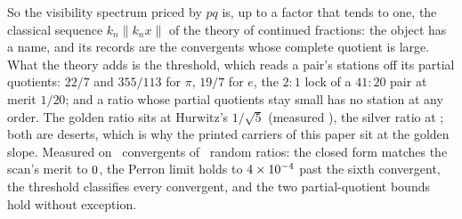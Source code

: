 So the visibility spectrum priced by $pq$ is, up to a factor that tends to
one, the classical sequence $k_n\lVert k_nx\rVert$ of the theory of continued
fractions: the object has a name, and its records are the convergents whose
complete quotient is large. What the theory adds is the threshold, which
reads a pair's stations off its partial quotients: $22/7$ and $355/113$ for
$\pi$, $19/7$ for $e$, the $2{:}1$ lock of a $41{:}20$ pair at merit $1/20$;
and a ratio whose partial quotients stay small has no station at any order.
The golden ratio sits at Hurwitz's $1/\sqrt5$ (measured
\stationsGoldenMerit), the silver ratio at \stationsSilverMerit; both are
deserts, which is why the printed carriers of this paper sit at the golden
slope. Measured on \stationsConvergents\ convergents of \stationsRatios\
random ratios: the closed form matches the scan's merit to
$0$, the Perron limit holds to $4\times 10^{-4}$ past
the sixth convergent, the threshold classifies every convergent, and the two
partial-quotient bounds hold without exception.
